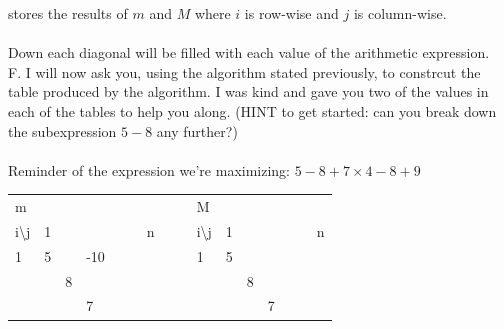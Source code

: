 \documentclass[12pt]{article}
\begin{document}
stores the results of $m$ and $M$ where $i$ is 
row-wise and $j$ is column-wise.\\\\
Down each diagonal will be filled with each value of the arithmetic expression.\\
F. I will now ask you, using the algorithm stated previously, 
to constrcut the table produced by the algorithm. I was kind and gave you
two of the values in each of the tables to help you along. (HINT to get started:
can you break down the subexpression $5-8$ any further?)\\\\
Reminder of the expression we're maximizing:
$5-8+7 \times 4-8+9$
\FloatBarrier
\begin{table}[]
    \begin{tabular}{llllllllllllllll}
    m                      &                        &                        &                          &                        &                        &                        &  &  & M                      &                        &                        &                        &                        &                        &                        \\
    i\textbackslash{}j     & 1                      &                        &                          &                        &                        & n                      &  &  & i\textbackslash{}j     & 1                      &                        &                        &                        &                        & n                      \\ \cline{2-7} \cline{11-16} 
    \multicolumn{1}{l|}{1} & \multicolumn{1}{l|}{5} & \multicolumn{1}{l|}{}  & \multicolumn{1}{l|}{-10} & \multicolumn{1}{l|}{}  & \multicolumn{1}{l|}{}  & \multicolumn{1}{l|}{}  &  &  & \multicolumn{1}{l|}{1} & \multicolumn{1}{l|}{5} & \multicolumn{1}{l|}{}  & \multicolumn{1}{l|}{}  & \multicolumn{1}{l|}{}  & \multicolumn{1}{l|}{}  & \multicolumn{1}{l|}{}  \\ \cline{2-7} \cline{11-16} 
    \multicolumn{1}{l|}{}  & \multicolumn{1}{l|}{}  & \multicolumn{1}{l|}{8} & \multicolumn{1}{l|}{}    & \multicolumn{1}{l|}{}  & \multicolumn{1}{l|}{}  & \multicolumn{1}{l|}{}  &  &  & \multicolumn{1}{l|}{}  & \multicolumn{1}{l|}{}  & \multicolumn{1}{l|}{8} & \multicolumn{1}{l|}{}  & \multicolumn{1}{l|}{}  & \multicolumn{1}{l|}{}  & \multicolumn{1}{l|}{}  \\ \cline{2-7} \cline{11-16} 
    \multicolumn{1}{l|}{}  & \multicolumn{1}{l|}{}  & \multicolumn{1}{l|}{}  & \multicolumn{1}{l|}{7}   & \multicolumn{1}{l|}{}  & \multicolumn{1}{l|}{}  & \multicolumn{1}{l|}{}  &  &  & \multicolumn{1}{l|}{}  & \multicolumn{1}{l|}{}  & \multicolumn{1}{l|}{}  & \multicolumn{1}{l|}{7} & \multicolumn{1}{l|}{}  & \multicolumn{1}{l|}{}  & \multicolumn{1}{l|}{}  \\ \cline{2-7} \cline{11-16} 

\end{tabular}
\end{table}
\end{document}
